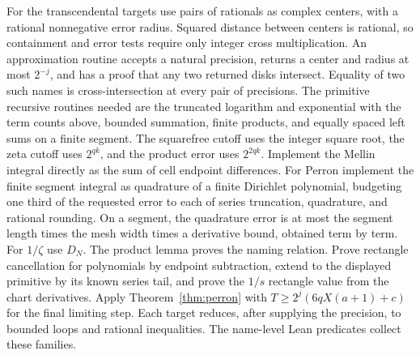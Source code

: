 For the transcendental targets use pairs of rationals as complex
centers, with a rational nonnegative error radius. Squared distance
between centers is rational, so containment and error tests require
only integer cross multiplication. An approximation routine accepts
a natural precision, returns a center and radius at most $2^{-j}$,
and has a proof that any two returned disks intersect. Equality of
two such names is cross-intersection at every pair of precisions.
The primitive recursive routines needed are the truncated logarithm
and exponential with the term counts above, bounded summation,
finite products, and equally spaced left sums on a finite segment.
The squarefree cutoff uses the integer square root, the zeta cutoff
uses $2^{qk}$, and the product error uses $2^{2qk}$.
Implement the Mellin integral directly as the sum of cell endpoint
differences. For Perron implement the finite segment integral as
quadrature of a finite Dirichlet polynomial, budgeting one third
of the requested error to each of series truncation, quadrature,
and rational rounding. On a segment, the quadrature error is at
most the segment length times the mesh width times a derivative
bound, obtained term by term. For $1/\zeta$ use $D_N$. The product
lemma proves the naming relation. Prove rectangle cancellation for
polynomials by endpoint subtraction, extend to the displayed
primitive by its known series tail, and prove the $1/s$ rectangle
value from the chart derivatives. Apply Theorem~\ref{thm:perron}
with $T\ge 2^j(6qX(a+1)+c)$ for the final limiting step. Each target
reduces, after supplying the precision, to bounded loops and rational
inequalities. The name-level Lean predicates collect these families.
